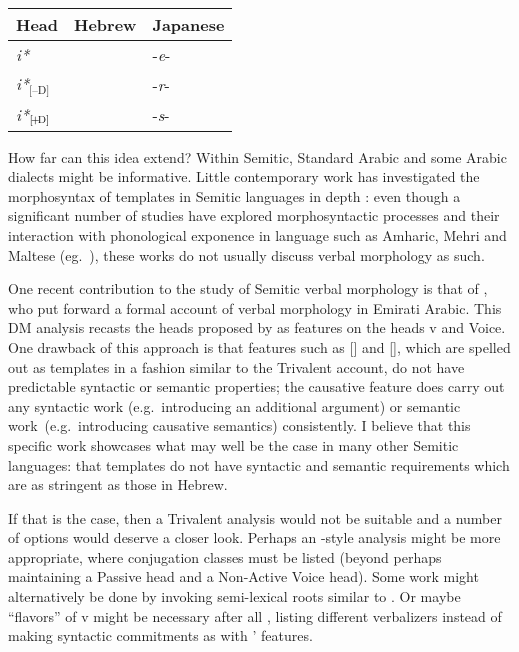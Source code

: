 \ex\label{ex:heads-langs2}
	\begin{tabular}{l|ll}
	Head 		& Hebrew 	  		& Japanese\\\hline
	\emph{i*}   	& \tkal          & -\emph{e}-\\
	\emph{i*}$_{\text{[--D]}}$ 	& \tnif 		& -\emph{r}-\\
	\emph{i*}$_{\text{[\!+\!D]}}$	& \thif		& -\emph{s}-\\
	\end{tabular}
\xe

How far can this idea extend? Within Semitic, Standard Arabic and some Arabic dialects might be informative. Little contemporary work has investigated the morphosyntax of templates in Semitic languages in depth \citep{kastnertucker19cup}: even though a significant number of studies have explored morphosyntactic processes and their interaction with phonological exponence in language such as Amharic, Mehri and Maltese (eg.~\citealt{kramer14,kramer16li,doronkhan16,faust16,faust18gjgl,faust19,rood17phd,winchester17nels,winchester19phd,kalin18,akkus19jl}), these works do not usually discuss verbal morphology as such.

One recent contribution to the study of Semitic verbal morphology is that of \cite{alkaabintelitheos19}, who put forward a formal account of verbal morphology in Emirati Arabic. This DM analysis recasts the heads proposed by \cite{doron03} as features on the heads v and Voice. One drawback of this approach is that features such as [] and [], which are spelled out as templates in a fashion similar to the Trivalent account, do not have predictable syntactic or semantic properties; the causative feature does carry out any syntactic work (e.g.~introducing an additional argument) or semantic work~(e.g.~introducing causative semantics) consistently. I believe that this specific work showcases what may well be the case in many other Semitic languages: that templates do not have syntactic and semantic requirements which are as stringent as those in Hebrew.

If that is the case, then a Trivalent analysis would not be suitable and a number of options would deserve a closer look. Perhaps an \citeauthor{arad05}-style analysis might be more appropriate, where conjugation classes must be listed (beyond perhaps maintaining a Passive head and a Non-Active Voice head). Some work might alternatively be done by invoking semi-lexical roots similar to {\va}. Or maybe ``flavors'' of v might be necessary after all \citep{katie13}, listing different verbalizers instead of making syntactic commitments as with \citeauthor{alkaabintelitheos19}' features.

